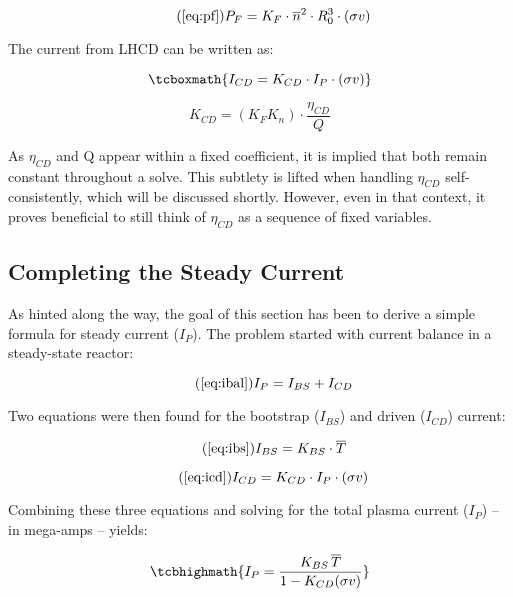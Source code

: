  \begin{equation}
	\tag{\ref{eq:pf}}
	P_F = K_F \cdot \overline{n}^2 \cdot R_0^3  \cdot (\sigma v)
\end{equation}

The current from LHCD can be written as:

\begin{equation}
	\label{eq:icd}
	\tcboxmath{
	I_{CD} = K_{CD} \cdot I_P \cdot ( \sigma v )
	}
\end{equation}

\begin{equation}
	K_{CD} = \left( K_F K_n \right) \cdot \frac{\eta_{CD}}{Q}
\end{equation}

As $\eta_{CD}$ and Q appear within a fixed coefficient, it is implied that both remain constant throughout a solve. This subtlety is lifted when handling $\eta_{CD}$ self-consistently, which will be discussed shortly. However, even in that context, it proves beneficial to still think of $\eta_{CD}$ as a sequence of fixed variables.

\subsection{Completing the Steady Current}

As hinted along the way, the goal of this section has been to derive a simple formula for steady current ($I_P$). The problem started with current balance in a steady-state reactor:

\begin{equation}
	\tag{\ref{eq:ibal}}
	I_P = I_{BS} + I_{CD}
\end{equation}

Two equations were then found for the bootstrap ($I_{BS}$) and driven ($I_{CD}$) current:

\begin{equation}
	\tag{\ref{eq:ibs}}
	I_{BS} = K_{BS} \cdot \overline T
\end{equation}

\begin{equation}
	\tag{\ref{eq:icd}}
	I_{CD} = K_{CD} \cdot I_P \cdot ( \sigma v )
\end{equation}

Combining these three equations and solving for the total plasma current ($I_P$) -- in mega-amps -- yields:

\begin{equation}
	\label{eq:steady}
	\tcbhighmath{
	I_P = \frac{ K_{BS} \, \overline T }{ 1 - K_{CD} ( \sigma v ) }
	}
\end{equation}

